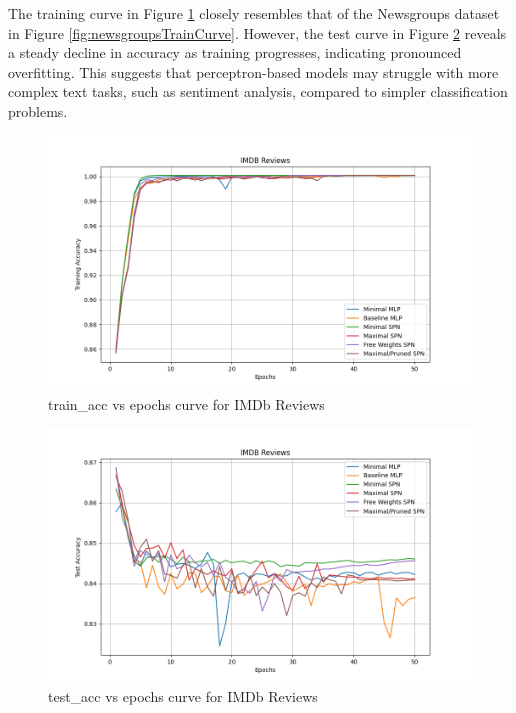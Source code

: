 The training curve in Figure \ref{fig:imdbTrainCurve} closely resembles that of the Newsgroups dataset in Figure \ref{fig:newsgroupsTrainCurve}. However, the test curve in Figure \ref{fig:imdbTestCurve} reveals a steady decline in accuracy as training progresses, indicating pronounced overfitting. This suggests that perceptron-based models may struggle with more complex text tasks, such as sentiment analysis, compared to simpler classification problems.

\begin{figure}[H]
    \centering
    \includegraphics[width=\linewidth]{Figures/Results/IMDB/training_accuracy_plot.png} %
    \captionsetup{width=\linewidth}
    \caption{train\_acc vs epochs curve for IMDb Reviews}
    \label{fig:imdbTrainCurve}
\end{figure}

\begin{figure}[H]
    \centering
    \includegraphics[width=\linewidth]{Figures/Results/IMDB/test_accuracy_plot.png} %
    \captionsetup{width=\linewidth}
    \caption{test\_acc vs epochs curve for IMDb Reviews}
    \label{fig:imdbTestCurve}
\end{figure}

